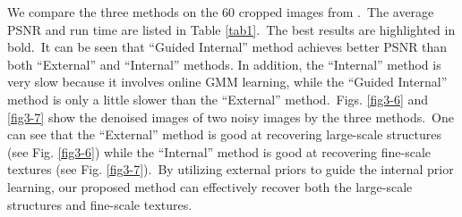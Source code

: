 We compare the three methods on the 60 cropped images from \cite{crosschannel2016}.\ The average PSNR and run time are listed in Table \ref{tab1}.\ The best results are highlighted in bold.\ It can be seen that ``Guided Internal'' method achieves better PSNR than both ``External'' and ``Internal'' methods. In addition, the ``Internal'' method is very slow because it involves online GMM learning, while the ``Guided Internal'' method is only a little slower than the ``External'' method.\ Figs. \ref{fig3-6} and \ref{fig3-7} show the denoised images of two noisy images by the three methods.\ One can see that the  ``External'' method is good at recovering large-scale structures (see Fig. \ref{fig3-6}) while the ``Internal'' method is good at recovering fine-scale textures (see Fig. \ref{fig3-7}).\ By utilizing external priors to guide the internal prior learning, our proposed method can effectively recover both the large-scale structures and fine-scale textures. 


